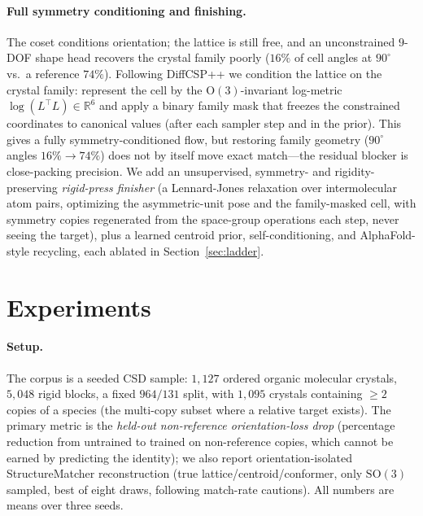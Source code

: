 \documentclass[10pt]{article}
\begin{document}
\paragraph{Full symmetry conditioning and finishing.}
The coset conditions orientation; the lattice is still free, and an unconstrained
$9$-DOF shape head recovers the crystal family poorly ($16\%$ of cell angles at
$90^\circ$ vs.\ a reference $74\%$). Following DiffCSP++\cite{jiao2024diffcsppp} we
condition the lattice on the crystal family: represent the cell by the
$\mathrm{O}(3)$-invariant log-metric $\log(L^\top L)\in\mathbb{R}^6$ and apply a
binary family mask that freezes the constrained coordinates to canonical values
(after each sampler step and in the prior). This gives a fully symmetry-conditioned
flow, but restoring family geometry ($90^\circ$ angles $16\%\!\to\!74\%$) does not
by itself move exact match---the residual blocker is close-packing precision. We
add an unsupervised, symmetry- and rigidity-preserving \emph{rigid-press finisher}
(a Lennard-Jones relaxation over intermolecular atom pairs, optimizing the
asymmetric-unit pose and the family-masked cell, with symmetry copies regenerated
from the space-group operations each step, never seeing the target), plus a learned
centroid prior, self-conditioning, and AlphaFold-style recycling, each ablated in
Section~\ref{sec:ladder}.

\section{Experiments}
\paragraph{Setup.}
The corpus is a seeded CSD sample\cite{groom2016csd}: $1{,}127$ ordered organic
molecular crystals, $5{,}048$ rigid blocks, a fixed $964/131$ split, with
$1{,}095$ crystals containing $\ge2$ copies of a species (the multi-copy subset
where a relative target exists). The primary metric is the \emph{held-out
non-reference orientation-loss drop} (percentage reduction from untrained to
trained on non-reference copies, which cannot be earned by predicting the
identity); we also report orientation-isolated StructureMatcher\cite{ong2013pymatgen}
reconstruction (true lattice/centroid/conformer, only $\mathrm{SO}(3)$ sampled,
best of eight draws, following match-rate cautions\cite{martirossyan2025matching}).
All numbers are means over three seeds.
\end{document}
